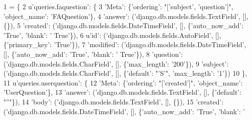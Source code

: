 \begin{DoxyCode}
1 = \{
2         \textcolor{stringliteral}{u'queries.faquestion'}: \{
3             \textcolor{stringliteral}{'Meta'}: \{\textcolor{stringliteral}{'ordering'}: \textcolor{stringliteral}{"['subject', 'question']"}, \textcolor{stringliteral}{'object\_name'}: \textcolor{stringliteral}{'FAQuestion'}\},
4             \textcolor{stringliteral}{'answer'}: (\textcolor{stringliteral}{'django.db.models.fields.TextField'}, [], \{\}),
5             \textcolor{stringliteral}{'created'}: (\textcolor{stringliteral}{'django.db.models.fields.DateTimeField'}, [], \{\textcolor{stringliteral}{'auto\_now\_add'}: \textcolor{stringliteral}{'True'}, \textcolor{stringliteral}{'blank'}: \textcolor{stringliteral}{'
      True'}\}),
6             \textcolor{stringliteral}{u'id'}: (\textcolor{stringliteral}{'django.db.models.fields.AutoField'}, [], \{\textcolor{stringliteral}{'primary\_key'}: \textcolor{stringliteral}{'True'}\}),
7             \textcolor{stringliteral}{'modified'}: (\textcolor{stringliteral}{'django.db.models.fields.DateTimeField'}, [], \{\textcolor{stringliteral}{'auto\_now\_add'}: \textcolor{stringliteral}{'True'}, \textcolor{stringliteral}{'blank'}: \textcolor{stringliteral}{'
      True'}\}),
8             \textcolor{stringliteral}{'question'}: (\textcolor{stringliteral}{'django.db.models.fields.CharField'}, [], \{\textcolor{stringliteral}{'max\_length'}: \textcolor{stringliteral}{'200'}\}),
9             \textcolor{stringliteral}{'subject'}: (\textcolor{stringliteral}{'django.db.models.fields.CharField'}, [], \{\textcolor{stringliteral}{'default'}: \textcolor{stringliteral}{"'S'"}, \textcolor{stringliteral}{'max\_length'}: \textcolor{stringliteral}{'1'}\})
10         \},
11         \textcolor{stringliteral}{u'queries.userquestion'}: \{
12             \textcolor{stringliteral}{'Meta'}: \{\textcolor{stringliteral}{'ordering'}: \textcolor{stringliteral}{"['created']"}, \textcolor{stringliteral}{'object\_name'}: \textcolor{stringliteral}{'UserQuestion'}\},
13             \textcolor{stringliteral}{'answer'}: (\textcolor{stringliteral}{'django.db.models.fields.TextField'}, [], \{\textcolor{stringliteral}{'default'}: \textcolor{stringliteral}{"''"}\}),
14             \textcolor{stringliteral}{'body'}: (\textcolor{stringliteral}{'django.db.models.fields.TextField'}, [], \{\}),
15             \textcolor{stringliteral}{'created'}: (\textcolor{stringliteral}{'django.db.models.fields.DateTimeField'}, [], \{\textcolor{stringliteral}{'auto\_now\_add'}: \textcolor{stringliteral}{'True'}, \textcolor{stringliteral}{'blank'}: \textcolor{stringliteral}{'
}
\end{DoxyCode}
